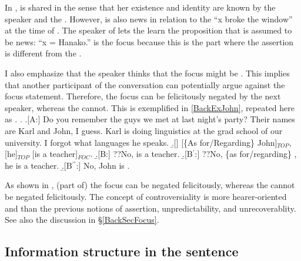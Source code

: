 In \Last[A],
 is shared in the sense that
her existence and identity are known by the speaker and the .
However,
 is also news in relation to the 
``x broke the window'' at the time of  \Last[Q].
The speaker of \Last[A] lets the  learn the proposition that is assumed to be news: ``x = Hanako.''
 is the focus because
this is the part where the assertion is different from the .

I also emphasize that the speaker thinks that the focus might be .
This implies that another participant of the conversation can potentially argue against the focus statement.
Therefore, the focus can be felicitously negated by the next speaker,
whereas the  cannot.
This is exemplified in \ref{BackExJohn}, repeated here as \Next.
%
\ex. \label{BackExJohn2}\a.[A:] Do you remember the guys we met at last night's party?
     Their names are Karl and John, I guess.
     Karl is doing linguistics at the grad school of our university.
     I forgot what languages he speaks.
     \b.[] [\{As for/Regarding\} John]$_{TOP}$, [he]$_{TOP}$ [is a teacher]$_{FOC}$.
     \b.[B:] ??No,  is a teacher.
     \b.[B$^{\prime}$:] ??No, \{as for/regarding\} , he is a teacher.
     \b.[B$^{\prime\prime}$:] No, John is .

As shown in \Last,
(part of) the focus  can be negated felicitously,
whereas the   cannot be negated felicitously.
The concept of controversiality is more hearer-oriented and  than the previous notions of assertion, unpredictability, and unrecoverablity.
See also the discussion in \S \ref{BackSecFocus}.

\subsection{Information structure in the sentence}\label{FrameworkIS}


